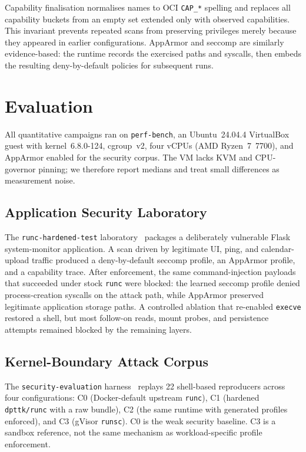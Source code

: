 \documentclass[runningheads]{llncs}
\begin{document}
Capability finalisation normalises names to OCI \texttt{CAP\_*} spelling and replaces all capability buckets from an empty set extended only with observed capabilities. This invariant prevents repeated scans from preserving privileges merely because they appeared in earlier configurations. AppArmor and seccomp are similarly evidence-based: the runtime records the exercised paths and syscalls, then embeds the resulting deny-by-default policies for subsequent runs.

\section{Evaluation}\label{sec:evaluation}

All quantitative campaigns ran on \texttt{perf-bench}, an Ubuntu~24.04.4 VirtualBox guest with kernel~6.8.0-124, cgroup~v2, four vCPUs (AMD Ryzen~7~7700), and AppArmor enabled for the security corpus. The VM lacks KVM and CPU-governor pinning; we therefore report medians and treat small differences as measurement noise.

\subsection{Application Security Laboratory}\label{sec:eval-security}

The \texttt{runc-hardened-test} laboratory~\cite{runchardenedtest} packages a deliberately vulnerable Flask system-monitor application. A scan driven by legitimate UI, ping, and calendar-upload traffic produced a deny-by-default seccomp profile, an AppArmor profile, and a capability trace. After enforcement, the same command-injection payloads that succeeded under stock \texttt{runc} were blocked: the learned seccomp profile denied process-creation syscalls on the attack path, while AppArmor preserved legitimate application storage paths. A controlled ablation that re-enabled \texttt{execve} restored a shell, but most follow-on reads, mount probes, and persistence attempts remained blocked by the remaining layers.

\subsection{Kernel-Boundary Attack Corpus}\label{sec:eval-security-corpus}

The \texttt{security-evaluation} harness~\cite{securityeval} replays 22 shell-based reproducers across four configurations: C0 (Docker-default upstream \texttt{runc}), C1 (hardened \texttt{dpttk/runc} with a raw bundle), C2 (the same runtime with generated profiles enforced), and C3 (gVisor \texttt{runsc}). C0 is the weak security baseline. C3 is a sandbox reference, not the same mechanism as workload-specific profile enforcement.
\end{document}
